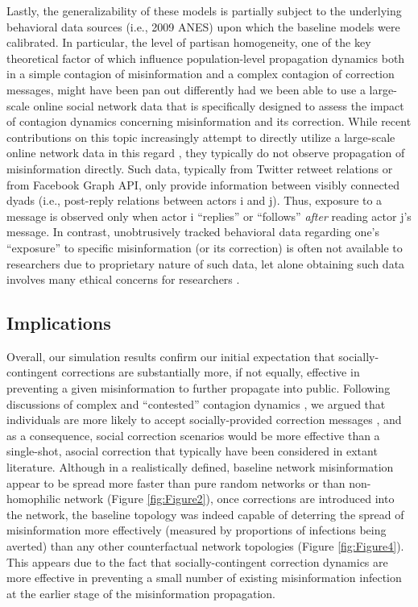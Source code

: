 \documentclass[man, 12pt, a4paper, nolmodern, noextraspace]{apa6}
\begin{document}
    Lastly, the generalizability of these models is partially subject to the underlying behavioral data sources (i.e., 2009 ANES) upon which the baseline models were calibrated. In particular, the level of partisan homogeneity, one of the key theoretical factor of which influence population-level propagation dynamics both in a simple contagion of misinformation and a complex contagion of correction messages, might have been pan out differently had we been able to use a large-scale online social network data that is specifically designed to assess the impact of contagion dynamics concerning misinformation and its correction. While recent contributions on this topic increasingly attempt to directly utilize a large-scale online network data in this regard \parencite[e.g.,][]{Bakshy_2012, del2016spreading}, they typically do not observe propagation of misinformation directly. Such data, typically from Twitter retweet relations or from Facebook Graph API, only provide information between visibly connected dyads (i.e., post-reply relations between actors i and j). Thus, exposure to a message is observed only when actor i ``replies'' or ``follows'' \emph{after} reading actor j’s message. In contrast, unobtrusively tracked behavioral data regarding one's ``exposure'' to specific misinformation (or its correction) is often not available to researchers due to proprietary nature of such data, let alone obtaining such data involves many ethical concerns for researchers \parencite[e.g.,][]{Kramer8788}.  
    
\subsection{Implications}
     Overall, our simulation results confirm our initial expectation that socially-contingent corrections are substantially more, if not equally, effective in preventing a given misinformation to further propagate into public. Following discussions of complex and ``contested'' contagion dynamics \parencite{centola2007complex, Centola2010Sience, Centola2007449, gonzalez2017decoding}, we argued that individuals are more likely to accept socially-provided correction messages \parencite[e.g.,][]{margolin2017, bode2017see}, and as a consequence, social correction scenarios would be more effective than a single-shot, asocial correction that typically have been considered in extant literature. Although in a realistically defined, baseline network misinformation appear to be spread more faster than pure random networks or than non-homophilic network (Figure \ref{fig:Figure2}), once corrections are introduced into the network, the baseline topology was indeed capable of deterring the spread of misinformation more effectively (measured by proportions of infections being averted) than any other counterfactual network topologies (Figure \ref{fig:Figure4}). This appears due to the fact that socially-contingent correction dynamics are more effective in preventing a small number of existing misinformation infection at the earlier stage of the misinformation propagation.    
\end{document}
